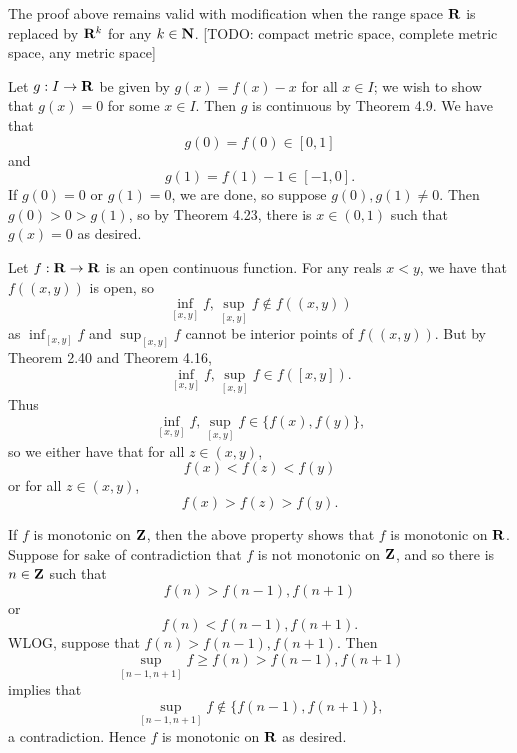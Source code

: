 \begin{ex}
The proof above remains valid with modification when the range space $\mathbf{R}$ is replaced by $\mathbf{R}^k$ for any $k \in \mathbf{N}$. [TODO: compact metric space, complete metric space, any metric space]
\end{ex}

\begin{ex}
Let $g: I \to \mathbf{R}$ be given by $g(x) = f(x) - x$ for all $x \in I$; we wish to show that $g(x) = 0$ for some $x \in I$. Then $g$ is continuous by Theorem 4.9. We have that \[g(0) = f(0) \in [0, 1]\] and \[g(1) = f(1) - 1 \in [-1, 0].\] If $g(0) = 0$ or $g(1) = 0$, we are done, so suppose $g(0), g(1) \not = 0$. Then $g(0) > 0 > g(1)$, so by Theorem 4.23, there is $x \in (0, 1)$ such that $g(x) = 0$ as desired.
\end{ex}

\begin{ex}
Let $f: \mathbf{R} \to \mathbf{R}$ is an open continuous function. For any reals $x < y$, we have that $f((x, y))$ is open, so \[\inf_{[x, y]}f, \sup_{[x, y]}f \not \in f((x, y))\] as $\inf_{[x, y]}f$ and $\sup_{[x, y]}f$ cannot be interior points of $f((x, y))$. But by Theorem 2.40 and Theorem 4.16, \[\inf_{[x, y]}f, \sup_{[x, y]}f \in f([x, y]).\] Thus \[\inf_{[x, y]}f, \sup_{[x, y]}f \in \{f(x), f(y)\},\] so we either have that for all $z \in (x, y)$, \[f(x) < f(z) < f(y)\] or for all $z \in (x, y)$, \[f(x) > f(z) > f(y).\]

If $f$ is monotonic on $\mathbf{Z}$, then the above property shows that $f$ is monotonic on $\mathbf{R}$. Suppose for sake of contradiction that $f$ is not monotonic on $\mathbf{Z}$, and so there is $n \in \mathbf{Z}$ such that \[f(n) > f(n-1), f(n+1)\] or \[f(n) < f(n-1), f(n+1).\] WLOG, suppose that $f(n) > f(n-1), f(n+1)$. Then \[\sup_{[n-1, n+1]}f \geq f(n) > f(n-1), f(n+1)\] implies that \[\sup_{[n-1, n+1]}f \not \in \{f(n-1), f(n+1)\},\] a contradiction. Hence $f$ is monotonic on $\mathbf{R}$ as desired.
\end{ex}

\begin{ex}

\end{ex}

